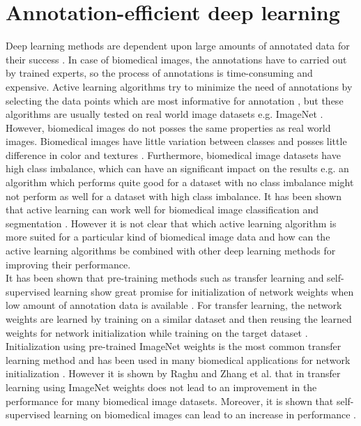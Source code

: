\section{Annotation-efficient deep learning}
Deep learning methods are dependent upon large amounts of annotated data for their success \cite{sun2017}. In case of biomedical images, the annotations have to carried out by trained experts, so the process of annotations is time-consuming and expensive. Active learning algorithms try to minimize the need of annotations by selecting the data points which are most informative for annotation \cite{settles2009, sadafi2019, joshi2009}, but these algorithms are usually tested on real world image datasets e.g. ImageNet \cite{gal2016, ducoffe2015, holub2008}. However, biomedical images do not posses the same properties as real world images. Biomedical images have little variation between classes and posses little difference in color and textures \cite{matek2019, esteva2017}. Furthermore, biomedical image datasets have high class imbalance, which can have an significant impact on the results e.g. an algorithm which performs quite good for a dataset with no class imbalance might not perform as well for a dataset with high class imbalance. It has been shown that active learning can work well for biomedical image classification \cite{sadafi2019, smailagic2018} and segmentation \cite{yang2017}. However it is not clear that which active learning algorithm is more suited for a particular kind of biomedical image data and how can the active learning algorithms be combined with other deep learning methods for improving their performance. \\
It has been shown that pre-training methods such as transfer learning and self-supervised learning show great promise for initialization of network weights when low amount of annotation data is available \cite{chen2020, oord2018, newell2020, sagheer2019}. For transfer learning, the network weights are learned by training on a similar dataset and then reusing the learned weights for network initialization while training on the target dataset \cite{jing2020}. Initialization using pre-trained ImageNet weights is the most common transfer learning method and has been used in many biomedical applications for network initialization \cite{rajpurkar2017, wang2017}. However it is shown by Raghu and Zhang et al. \cite{raghu2019} that in transfer learning using ImageNet weights does not lead to an improvement in the performance for many biomedical image datasets. Moreover, it is shown that self-supervised learning on biomedical images can lead to an increase in performance \cite{holmberg2020}. \\

